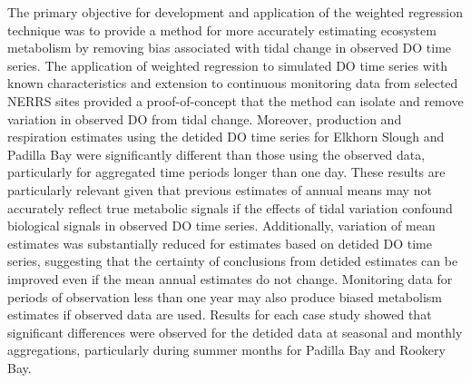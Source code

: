 \documentclass[letterpaper,12pt,oneside]{article}\usepackage[]{graphicx}\usepackage[]{color}
\begin{document}
The primary objective for development and application of the weighted regression technique was to provide a method for more accurately estimating ecosystem metabolism by removing bias associated with tidal change in observed \ac{DO} time series.  The application of weighted regression to simulated \ac{DO} time series with known characteristics and extension to continuous monitoring data from selected \ac{NERRS} sites provided a proof-of-concept that the method can isolate and remove variation in observed \ac{DO} from tidal change.  Moreover, production and respiration estimates using the detided \ac{DO} time series for Elkhorn Slough and Padilla Bay were significantly different than those using the observed data, particularly for aggregated time periods longer than one day. These results are particularly relevant given that previous estimates of annual means may not accurately reflect true metabolic signals if the effects of tidal variation confound biological signals in observed \ac{DO} time series.  Additionally, variation of mean estimates was substantially reduced for estimates based on detided \ac{DO} time series, suggesting that the certainty of conclusions from detided estimates can be improved even if the mean annual estimates do not change.  Monitoring data for periods of observation less than one year may also produce biased metabolism estimates if observed data are used.  Results for each case study showed that significant differences were observed for the detided data at seasonal and monthly aggregations, particularly during summer months for Padilla Bay and Rookery Bay.  
\end{document}

